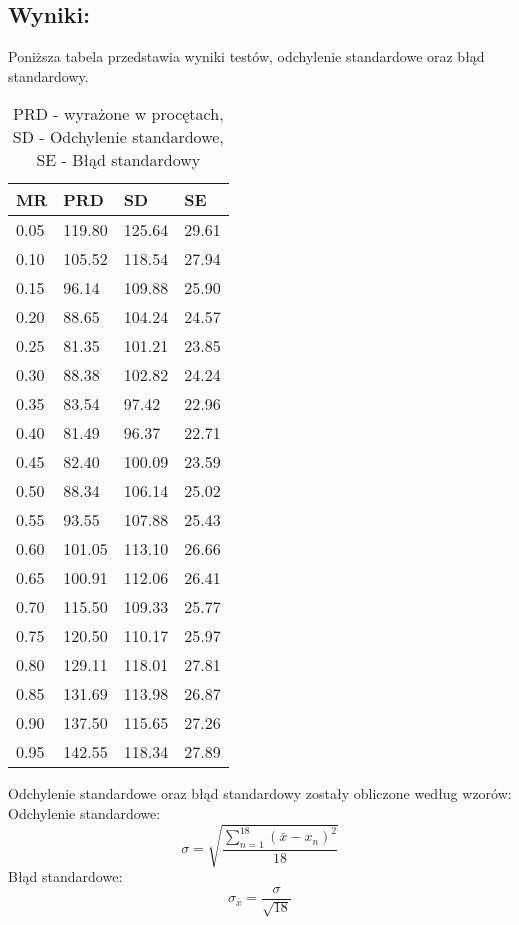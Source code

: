   \subsection{Wyniki: }
  Poniższa tabela przedstawia wyniki testów, odchylenie standardowe oraz błąd standardowy.
  \begin{table}[!ht]
    \centering
    \begin{tabular}{|l|l|l|l|}
    \hline
        MR & PRD & SD & SE \\ \hline
        0.05 & 119.80 & 125.64 & 29.61 \\ \hline
        0.10 & 105.52 & 118.54 & 27.94 \\ \hline
        0.15 & 96.14 & 109.88 & 25.90 \\ \hline
        0.20 & 88.65 & 104.24 & 24.57 \\ \hline
        0.25 & 81.35 & 101.21 & 23.85 \\ \hline
        0.30 & 88.38 & 102.82 & 24.24 \\ \hline
        0.35 & 83.54 & 97.42 & 22.96 \\ \hline
        0.40 & 81.49 & 96.37 & 22.71 \\ \hline
        0.45 & 82.40 & 100.09 & 23.59 \\ \hline
        0.50 & 88.34 & 106.14 & 25.02 \\ \hline
        0.55 & 93.55 & 107.88 & 25.43 \\ \hline
        0.60 & 101.05 & 113.10 & 26.66 \\ \hline
        0.65 & 100.91 & 112.06 & 26.41 \\ \hline
        0.70 & 115.50 & 109.33 & 25.77 \\ \hline
        0.75 & 120.50 & 110.17 & 25.97 \\ \hline
        0.80 & 129.11 & 118.01 & 27.81 \\ \hline
        0.85 & 131.69 & 113.98 & 26.87 \\ \hline
        0.90 & 137.50 & 115.65 & 27.26 \\ \hline
        0.95 & 142.55 & 118.34 & 27.89 \\ \hline
    \end{tabular}
    \caption{PRD - wyrażone w procętach, SD - Odchylenie standardowe, SE - Błąd standardowy}
  \end{table}

  Odchylenie standardowe oraz błąd standardowy zostały obliczone według wzorów: \\
  Odchylenie standardowe:
  \[ \sigma = \sqrt{\frac{\sum_{n = 1}^{18}(\bar{x} - x_n)^2}{18}} \]
  Błąd standardowe:
  \[ \sigma_{\bar{x}} = \frac{\sigma}{\sqrt{18}} \]

